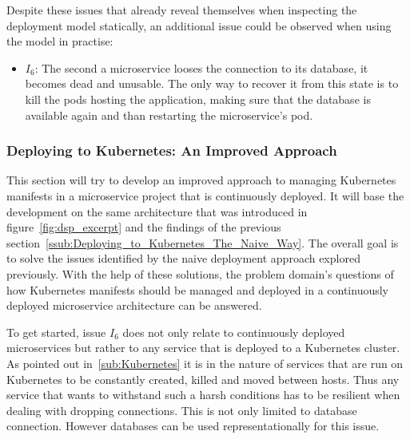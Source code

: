 Despite these issues that already reveal themselves when inspecting the
deployment model statically, an additional issue could be observed when using
the model in practise:

\begin{itemize}
  \item \textit{$I_6$}: The second a microservice looses the connection to its database, it
    becomes dead and unusable. The only way to recover it from this state is to
    kill the pods hosting the application, making sure that the database is
    available again and than restarting the microservice's pod.
\end{itemize}

\subsubsection{Deploying to Kubernetes: An Improved Approach}%
\label{ssub:Deploying_to_Kubernetes_An_Improved_Approach}

This section will try to develop an improved approach to managing Kubernetes
manifests in a microservice project that is continuously deployed. It will base
the development on the same architecture that was introduced in
figure~\ref{fig:dsp_excerpt} and the findings of the previous
section~\ref{ssub:Deploying_to_Kubernetes_The_Naive_Way}. The overall goal is
to solve the issues identified by the naive deployment approach explored
previously. With the help of these solutions, the problem domain's questions of
how Kubernetes manifests should be managed and deployed in a continuously
deployed microservice architecture can be answered.

To get started, issue $I_6$ does not only relate to continuously deployed
microservices but rather to any service that is deployed to a Kubernetes
cluster. As pointed out in~\ref{sub:Kubernetes} it is in the nature of services
that are run on Kubernetes to be constantly created, killed and moved between
hosts. Thus any service that wants to withstand such a harsh conditions has to
be resilient when dealing with dropping connections. This is not only limited
to database connection. However databases can be used representationally for
this issue.

